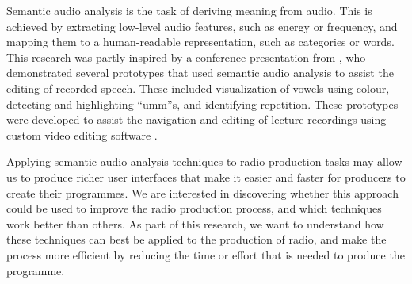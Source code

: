 Semantic audio analysis is the task of deriving meaning from audio. This is achieved by extracting low-level audio
features, such as energy or frequency, and mapping them to a human-readable representation, such as categories or
words.
This research was partly inspired by a conference presentation from \citet{Loviscach2013}, who demonstrated several
prototypes that used semantic audio analysis to assist the editing of recorded speech. These included visualization of
vowels using colour, detecting and highlighting ``umm''s, and identifying repetition. These prototypes were developed
to assist the navigation and editing of lecture recordings using custom video editing software \citep{Loviscach2011a}.

Applying semantic audio analysis techniques to radio production tasks may allow us to produce richer user interfaces
that make it easier and faster for producers to create their programmes.  We are interested in discovering whether this
approach could be used to improve the radio production process, and which techniques work better than others.  As part
of this research, we want to understand how these techniques can best be applied to the production of radio, and make
the process more efficient by reducing the time or effort that is needed to produce the programme. 



